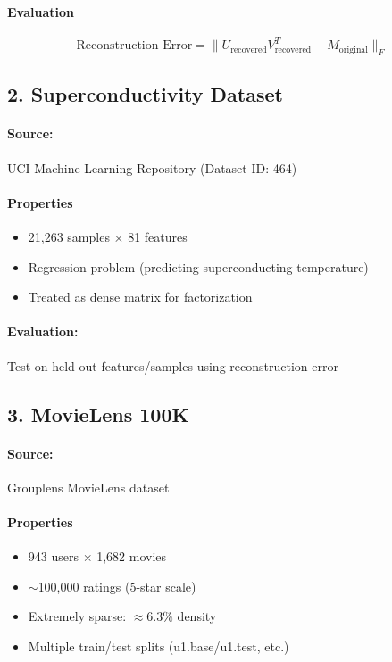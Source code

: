 \documentclass[11pt,oneside]{article}
\begin{document}
\paragraph{Evaluation}

\begin{equation}
    \text{Reconstruction Error} = \|U_{\text{recovered}}V_{\text{recovered}}^T - M_{\text{original}}\|_F
\end{equation}

\subsection*{2. Superconductivity Dataset}

\paragraph{Source:} UCI Machine Learning Repository (Dataset ID: 464)

\paragraph{Properties}
\begin{itemize}
    \item 21,263 samples $\times$ 81 features
    \item Regression problem (predicting superconducting temperature)
    \item Treated as dense matrix for factorization
\end{itemize}

\paragraph{Evaluation:} Test on held-out features/samples using reconstruction error

\subsection*{3. MovieLens 100K}

\paragraph{Source:} Grouplens MovieLens dataset

\paragraph{Properties}
\begin{itemize}
    \item 943 users $\times$ 1,682 movies
    \item $\sim$100,000 ratings (5-star scale)
    \item Extremely sparse: $\approx 6.3\%$ density
    \item Multiple train/test splits (u1.base/u1.test, etc.)
\end{itemize}
\end{document}
